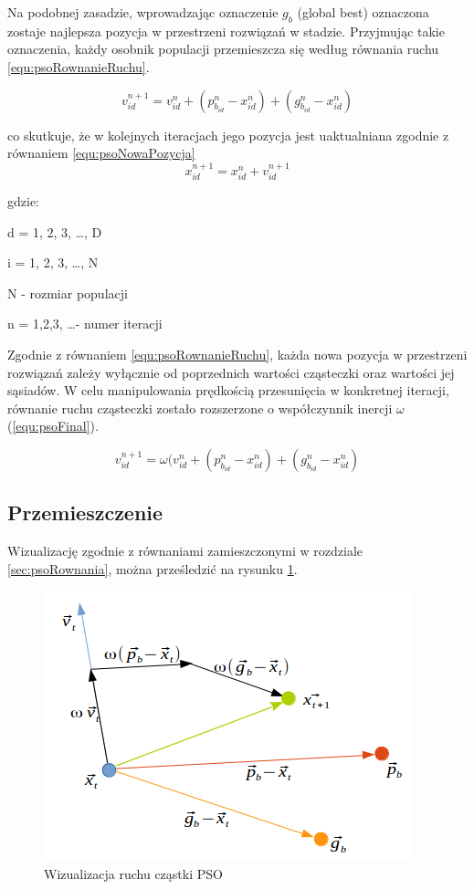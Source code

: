 Na podobnej zasadzie, wprowadzając oznaczenie $g_b$ (global best) oznaczona zostaje najlepsza pozycja w przestrzeni rozwiązań w stadzie. Przyjmując takie oznaczenia, każdy osobnik populacji przemieszcza się według równania ruchu \ref{equ:psoRownanieRuchu}.

\begin{equation}
\label{equ:psoRownanieRuchu}
v_{id}^{n+1} = v_{id}^{n} + (p_{b_{id}}^n - x_{id}^n) + (g_{b_{id}}^n - x_{id}^n)
\end{equation}

co skutkuje, że w kolejnych iteracjach jego pozycja jest uaktualniana zgodnie z równaniem \ref{equ:psoNowaPozycja}
\begin{equation}
\label{equ:psoNowaPozycja}
x_{id}^{n+1} = x_{id}^n + v_{id}^{n+1}
\end{equation}

gdzie:

d = 1, 2, 3, \dots, D

i = 1, 2, 3, \dots, N

N - rozmiar populacji

n = 1,2,3, \dots - numer iteracji

Zgodnie z równaniem \ref{equ:psoRownanieRuchu}, każda nowa pozycja w przestrzeni rozwiązań zależy wyłącznie od poprzednich wartości cząsteczki oraz wartości jej sąsiadów. W celu manipulowania prędkością przesunięcia w konkretnej iteracji, równanie ruchu cząsteczki zostało rozszerzone o współczynnik inercji $\omega$ (\ref{equ:psoFinal}).

\begin{equation}
\label{equ:psoFinal}
v_{id}^{n+1} = \omega(v_{id}^{n} + (p_{b_{id}}^n - x_{id}^n) + (g_{b_{id}}^n - x_{id}^n)
\end{equation}


\subsection{Przemieszczenie}
\label{sec:psoPrzemieszczenie}
Wizualizację zgodnie z równaniami zamieszczonymi w rozdziale \ref{sec:psoRownania}, można prześledzić na rysunku \ref{fig:psoWizualizacja}.

\begin{figure}[H]
\begin{center} 
\includegraphics[scale=0.8]{tresc/pics/psoRuch.png}
\caption{Wizualizacja ruchu cząstki PSO}
\label{fig:psoWizualizacja}
\end{center}
\end{figure}

